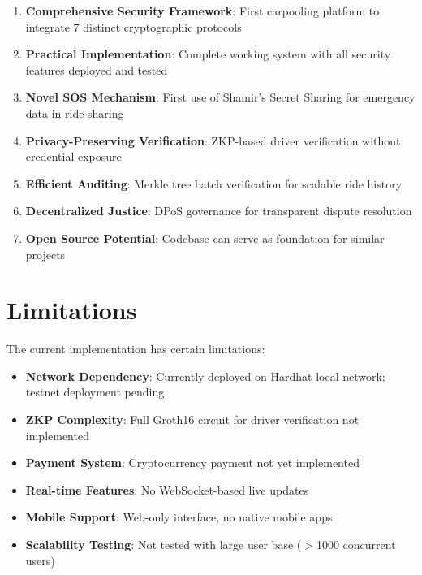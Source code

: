 \documentclass[12pt]{report}
\theoremstyle{plain}
\theoremstyle{definition}
\theoremstyle{remark}
\begin{document}
\begin{enumerate}
    \item \textbf{Comprehensive Security Framework}: First carpooling platform to integrate 7 distinct cryptographic protocols
    
    \item \textbf{Practical Implementation}: Complete working system with all security features deployed and tested
    
    \item \textbf{Novel SOS Mechanism}: First use of Shamir's Secret Sharing for emergency data in ride-sharing
    
    \item \textbf{Privacy-Preserving Verification}: ZKP-based driver verification without credential exposure
    
    \item \textbf{Efficient Auditing}: Merkle tree batch verification for scalable ride history
    
    \item \textbf{Decentralized Justice}: DPoS governance for transparent dispute resolution
    
    \item \textbf{Open Source Potential}: Codebase can serve as foundation for similar projects
\end{enumerate}

\section{Limitations}

The current implementation has certain limitations:

\begin{itemize}
    \item \textbf{Network Dependency}: Currently deployed on Hardhat local network; testnet deployment pending
    \item \textbf{ZKP Complexity}: Full Groth16 circuit for driver verification not implemented
    \item \textbf{Payment System}: Cryptocurrency payment not yet implemented
    \item \textbf{Real-time Features}: No WebSocket-based live updates
    \item \textbf{Mobile Support}: Web-only interface, no native mobile apps
    \item \textbf{Scalability Testing}: Not tested with large user base ($>$1000 concurrent users)
\end{itemize}
\end{document}
